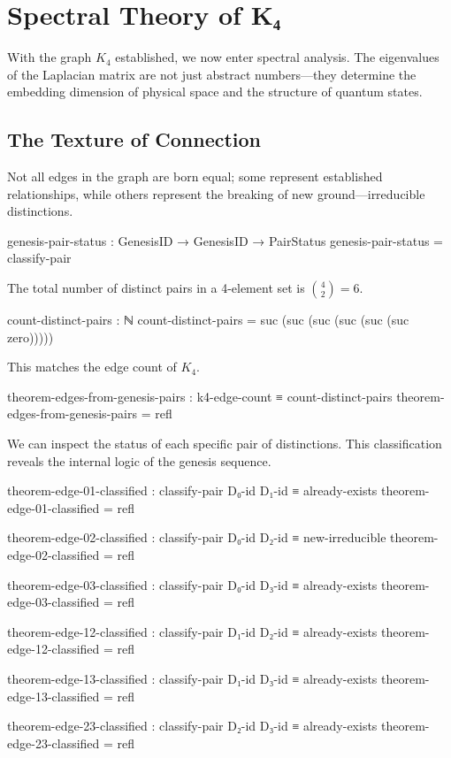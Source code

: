 \documentclass[11pt,a4paper]{book}
\begin{document}
\chapter{Spectral Theory of K₄}
\label{chap:spectral-k4}

With the graph $K_4$ established, we now enter spectral analysis. The eigenvalues of the 
Laplacian matrix are not just abstract numbers—they determine the embedding dimension 
of physical space and the structure of quantum states.

\section{The Texture of Connection}

Not all edges in the graph are born equal; some represent established relationships, while others represent the breaking of new ground---irreducible distinctions.

\begin{code}
genesis-pair-status : GenesisID → GenesisID → PairStatus
genesis-pair-status = classify-pair

\end{code}

The total number of distinct pairs in a 4-element set is $\binom{4}{2} = 6$.

\begin{code}
count-distinct-pairs : ℕ
count-distinct-pairs = suc (suc (suc (suc (suc (suc zero)))))

\end{code}

This matches the edge count of $K_4$.

\begin{code}
theorem-edges-from-genesis-pairs : k4-edge-count ≡ count-distinct-pairs
theorem-edges-from-genesis-pairs = refl

\end{code}

We can inspect the status of each specific pair of distinctions. This classification reveals the internal logic of the genesis sequence.

\begin{code}
theorem-edge-01-classified : classify-pair D₀-id D₁-id ≡ already-exists
theorem-edge-01-classified = refl

theorem-edge-02-classified : classify-pair D₀-id D₂-id ≡ new-irreducible
theorem-edge-02-classified = refl

theorem-edge-03-classified : classify-pair D₀-id D₃-id ≡ already-exists
theorem-edge-03-classified = refl

theorem-edge-12-classified : classify-pair D₁-id D₂-id ≡ already-exists
theorem-edge-12-classified = refl

theorem-edge-13-classified : classify-pair D₁-id D₃-id ≡ already-exists
theorem-edge-13-classified = refl

theorem-edge-23-classified : classify-pair D₂-id D₃-id ≡ already-exists
theorem-edge-23-classified = refl

\end{code}
\end{document}
